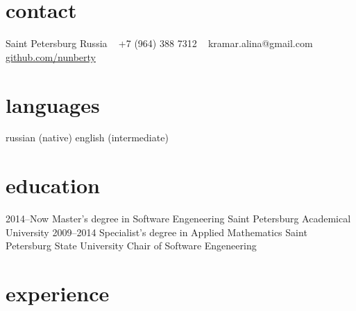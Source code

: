 \documentclass[]{friggeri-cv} %
\begin{document}


\begin{aside} %
\section{contact}
Saint Petersburg
Russia
~
+7 (964) 388 7312
~
kramar.alina@gmail.com
\href{https://github.com/nunberty}{github.com/nunberty}
\section{languages}
russian (native)
english (intermediate)
\end{aside}

\section{education}

\begin{entrylist}
\entry
{2014--Now}
{Master's degree {\normalfont in Software Engeneering}}
{Saint Petersburg Academical University}
{}
\entry
{2009--2014}
{Specialist's degree {\normalfont in Applied Mathematics}}
{Saint Petersburg State University}
{Chair of Software Engeneering}
\end{entrylist}

\section{experience}
\end{document}

